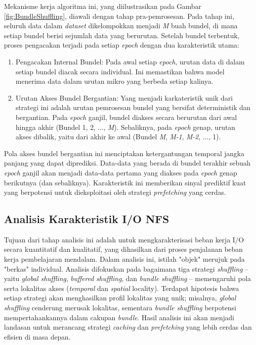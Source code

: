Mekanisme kerja algoritma ini, yang diilustrasikan pada Gambar \ref{fig:BundleShuffling}, diawali dengan tahap pra-pemrosesan. Pada tahap ini, seluruh data dalam \textit{dataset} dikelompokkan menjadi \textit{M} buah bundel, di mana setiap bundel berisi sejumlah data yang berurutan. Setelah bundel terbentuk, proses pengacakan terjadi pada setiap \textit{epoch} dengan dua karakteristik utama:
\begin{enumerate}
    \item Pengacakan Internal Bundel: Pada awal setiap \textit{epoch}, urutan data di dalam setiap bundel diacak secara individual. Ini memastikan bahwa model menerima data dalam urutan mikro yang berbeda setiap kalinya.
    \item Urutan Akses Bundel Bergantian: Yang menjadi karkateristik unik dari strategi ini adalah urutan pemrosesan bundel yang bersifat deterministik dan bergantian. Pada \textit{epoch} ganjil, bundel diakses secara berurutan dari awal hingga akhir (Bundel 1, 2, ..., \textit{M}). Sebaliknya, pada \textit{epoch} genap, urutan akses dibalik, yaitu dari akhir ke awal (Bundel \textit{M}, \textit{M-1}, \textit{M-2}, ..., 1).
\end{enumerate}

Pola akses bundel bergantian ini menciptakan ketergantungan temporal jangka panjang yang dapat diprediksi. Data-data yang berada di bundel terakhir sebuah \textit{epoch} ganjil akan menjadi data-data pertama yang diakses pada \textit{epoch} genap berikutnya (dan sebaliknya). Karakteristik ini memberikan sinyal prediktif kuat yang berpotensi untuk dieksploitasi oleh strategi \textit{prefetching} yang cerdas.

\subsection{Analisis Karakteristik I/O NFS}
Tujuan dari tahap analisis ini adalah untuk mengkarakterisasi beban kerja I/O secara kuantitatif dan kualitatif, yang dihasilkan dari proses penjalanan beban kerja pembelajaran mendalam. Dalam analisis ini, istilah "objek" merujuk pada "berkas" individual. Analisis difokuskan pada bagaimana tiga strategi \textit{shuffling} -- yaitu \textit{global shuffling}, \textit{buffered shuffling}, dan \textit{bundle shuffling} -- memengaruhi pola serta lokalitas akses (\textit{temporal} dan \textit{spatial} locality). Terdapat hipotesis bahwa setiap strategi akan menghasilkan profil lokalitas yang unik; misalnya, \textit{global shuffling} cenderung merusak lokalitas, sementara \textit{bundle shuffling} berpotensi mempertahankannya dalam cakupan \textit{bundle}. Hasil analisis ini akan menjadi landasan untuk merancang strategi \textit{caching} dan \textit{prefetching} yang lebih cerdas dan efisien di masa depan.

